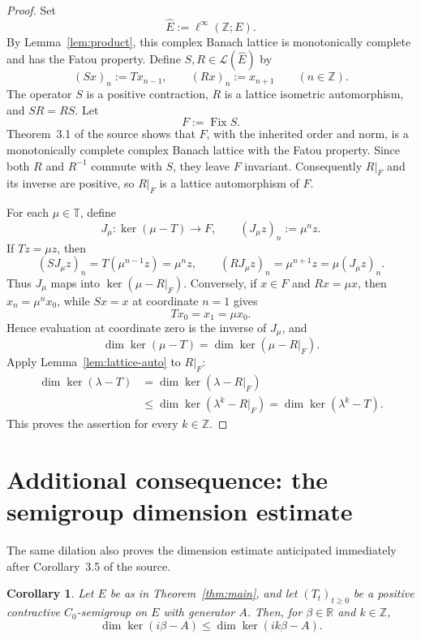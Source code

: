 \documentclass[11pt]{article}
\newtheorem{corollary}[theorem]{Corollary}
\newcommand{\Fix}{\operatorname{Fix}}
\newcommand{\cL}{\mathcal L}
\newcommand{\Torus}{\mathbb T}
\begin{document}
\begin{proof}
Set
\[
 \widehat E:=\ell^\infty(\mathbb Z;E).
\]
By Lemma~\ref{lem:product}, this complex Banach lattice is monotonically
complete and has the Fatou property.  Define \(S,R\in\cL(\widehat E)\) by
\[
 (Sx)_n:=T x_{n-1},
 \qquad
 (Rx)_n:=x_{n+1}
 \qquad(n\in\mathbb Z).
\]
The operator \(S\) is a positive contraction, \(R\) is a lattice isometric
automorphism, and \(SR=RS\).  Let
\[
 F:=\Fix S.
\]
Theorem~3.1 of the source \cite{GlueckFixed} shows that \(F\), with the
inherited order and norm, is a monotonically complete complex Banach lattice
with the Fatou property.  Since both \(R\) and \(R^{-1}\) commute with \(S\),
they leave \(F\) invariant.  Consequently \(R|_F\) and its inverse are
positive, so \(R|_F\) is a lattice automorphism of \(F\).

For each \(\mu\in\Torus\), define
\[
 J_\mu:\ker(\mu-T)\longrightarrow F,\qquad
 (J_\mu z)_n:=\mu^n z.
\]
If \(Tz=\mu z\), then
\[
 (S J_\mu z)_n
 =T(\mu^{n-1}z)
 =\mu^n z,
 \qquad
 (R J_\mu z)_n=\mu^{n+1}z
 =\mu(J_\mu z)_n.
\]
Thus \(J_\mu\) maps into \(\ker(\mu-R|_F)\).  Conversely, if
\(x\in F\) and \(Rx=\mu x\), then \(x_n=\mu^n x_0\), while \(Sx=x\)
at coordinate \(n=1\) gives
\[
 T x_0=x_1=\mu x_0.
\]
Hence evaluation at coordinate zero is the inverse of \(J_\mu\), and
\[
 \dim\ker(\mu-T)=\dim\ker(\mu-R|_F).
\]
Apply Lemma~\ref{lem:lattice-auto} to \(R|_F\):
\[
\begin{aligned}
 \dim\ker(\lambda-T)
 &=\dim\ker(\lambda-R|_F)\\
 &\leq\dim\ker(\lambda^k-R|_F)
 =\dim\ker(\lambda^k-T).
\end{aligned}
\]
This proves the assertion for every \(k\in\mathbb Z\).
\end{proof}

\section*{Additional consequence: the semigroup dimension estimate}

The same dilation also proves the dimension estimate anticipated immediately
after Corollary~3.5 of the source.

\begin{corollary}\label{cor:semigroup}
Let \(E\) be as in Theorem~\ref{thm:main}, and let
\((T_t)_{t\geq0}\) be a positive contractive \(C_0\)-semigroup on \(E\)
with generator \(A\).  Then, for \(\beta\in\mathbb R\) and
\(k\in\mathbb Z\),
\[
 \dim\ker(i\beta-A)\leq\dim\ker(ik\beta-A).
\]
\end{corollary}
\end{document}

